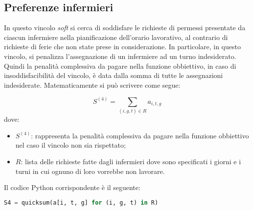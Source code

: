 \subsection{Preferenze infermieri}
In questo vincolo \textit{soft} si cerca di soddisfare le richieste di permessi presentate da ciascun infermiere nella pianificazione dell'orario lavorativo, al contrario di richieste di ferie che non state prese in considerazione. In particolare, in questo vincolo, si penalizza l'assegnazione di un infermiere ad un turno indesiderato. Quindi la penalità complessiva da pagare nella funzione obbiettivo, in caso di insoddisfacibilità del vincolo, è data dalla somma di tutte le assegnazioni indesiderate.
Matematicamente si può scrivere come segue:

\begin{equation}
S^{(4)} = \sum_{(i, g, t) \in R} a_{i, t, g}
\end{equation}
dove:
\begin{itemize}
\item $S^{(4)}$: rappresenta la penalità complessiva da pagare nella funzione obbiettivo nel caso il vincolo non sia rispettato;
\item $R$: lista delle richieste fatte dagli infermieri dove sono specificati i giorni e i turni in cui ognuno di loro vorrebbe non lavorare.
\end{itemize}

Il codice Python corrispondente è il seguente:
\begin{lstlisting}[language=Python]
S4 = quicksum(a[i, t, g] for (i, g, t) in R)
\end{lstlisting}

